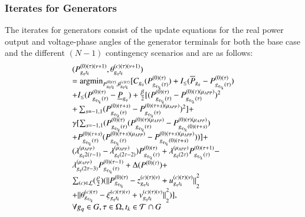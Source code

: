 \documentclass[preprint,12pt,3p]{elsarticle}
\begin{document}
\subsubsection{Iterates for Generators}The iterates for generators consist of the update equations for the real power output and voltage-phase angles of the generator terminals for both the base case and the different $(N-1)$ contingency scenarios and are as follows:
\begin{equation}\label{ADMM_Lookahead_Demand_Gen}
\begin{array}{ll}
(P_{{g_q}{t_k}}^{(0)(\tau)(\nu+1)},\theta_{{g_q}{t_k}}^{(c)(\tau)(\nu+1)})\\=\mbox{argmin}_{P_{{g_q}{t_k}}^{(0)(\tau)},\theta_{{g_q}{t_k}}^{(c)(\tau)}}[C_{g_q}({P}_{{g_q}_{t_k}(\tau)}^{(0)(\tau)})+I_{\leq}(\overline{P}_{g_q}-{P}_{{g_q}_{t_k}(\tau)}^{(0)(\tau)})
\notag\\+I_{\leq}({P}_{{g_q}_{t_k}(\tau)}^{(0)(\tau)}-\underline{P}_{g_q})+\frac{\beta}{2}[({P}_{{g_q}_{t_k}(\tau)}^{(0)(\tau)}-{P}_{{g_q}_{t_k}(\tau)}^{(0)(\tau)(\mu_{APP})})^2\notag\\+\sum_{s=-1,1}({P}_{{g_q}_{t_k}(\tau)}^{(0)(\tau+s)}-{P}_{{g_q}_{t_k}(\tau)}^{(0)(\tau+s)(\mu_{APP})})^2]+\notag\\\gamma[\sum_{s=-1,1}({P}_{{g_q}_{t_k}(\tau)}^{(0)(\tau)}({P}_{{g_q}_{t_k}(\tau)}^{(0)(\tau)(\mu_{APP})}-{P}_{{g_q}_{t_k}(0)(\tau+s)}^{(0)(\tau)(\mu_{APP})})\notag\\+{P}_{{g_q}_{t_k}(\tau)}^{(0)(\tau+s)}({P}_{{g_q}_{t_k}(\tau)}^{(0)(\tau+s)(\mu_{APP})}-{P}_{{g_q}_{t_k}(0)(\tau+s)}^{(0)(\tau+s)(\mu_{APP})}))]+\notag\\(\lambda_{{g_q}2(\tau-1)}^{(\mu_{APP})}-\lambda_{{g_q}(2\tau-2)}^{(\mu_{APP})}){P}_{{g_q}_{t_k}(\tau)}^{(0)(\tau)}+\lambda_{{g_q}(2\tau)}^{(\mu_{APP})}{P}_{{g_q}_{t_k}(\tau)}^{(0)(\tau+1)}-\notag\\\lambda_{{g_q}(2\tau-3)}^{(\mu_{APP})}{P}_{{g_q}_{t_k}(\tau)}^{(0)(\tau-1)}+\Delta(P^{(0)(\tau)})+\notag\\
\sum_{(c)\in\mathcal{L}}(\frac{\rho}{2})({||P_{{g_q}_{t_k}}^{(0)(\tau)}-z_{{g_q}{t_k}}^{(c)(\tau)(\nu)}+u_{{g_q}{t_k}}^{(c)(\tau)(\nu)}||}_{2}^{2}\\+{||\theta_{{g_q}_{t_k}}^{(c)(\tau)}-\xi_{{g_q}{t_k}}^{(c)(\tau)(\nu)}+v_{{g_q}{t_k}}^{(c)(\tau)(\nu)}||}_{2}^{2})],\\
\forall g_q\in G, \tau\in\Omega,t_k\in\mathcal{T}\cap G
\end{array}
\end{equation}
\end{document}
